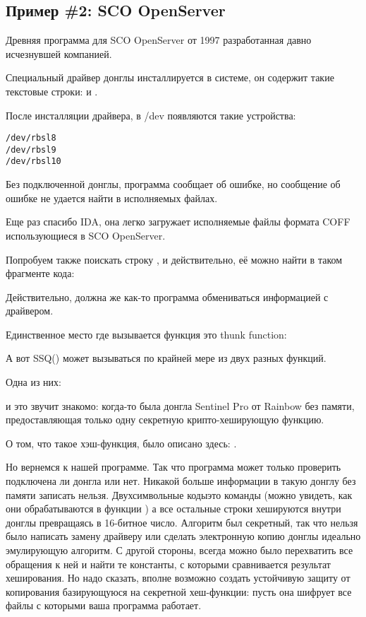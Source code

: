 \subsection{Пример \#2: SCO OpenServer}

\label{examples_SCO}
Древняя программа для SCO OpenServer от 1997 
разработанная давно исчезнувшей компанией.

Специальный драйвер донглы инсталлируется в системе, он содержит такие текстовые строки:
 и .

После инсталляции драйвера, в /dev появляются такие устройства:

\begin{lstlisting}
/dev/rbsl8
/dev/rbsl9
/dev/rbsl10
\end{lstlisting}

Без подключенной донглы, программа сообщает об ошибке, но сообщение об ошибке не удается
найти в исполняемых файлах.

Еще раз спасибо \ac{IDA}, она легко загружает исполняемые файлы формата COFF использующиеся в SCO OpenServer.

Попробуем также поискать строку , и действительно, её можно найти в таком фрагменте кода:



Действительно, должна же как-то программа обмениваться информацией с драйвером.

Единственное место где вызывается функция 
это \gls{thunk function}:



А вот SSQ() может вызываться по крайней мере из двух разных функций.

Одна из них:



 и  \EMDASH{}это звучит знакомо: когда-то была донгла
 Sentinel Pro от Rainbow без памяти,
предоставляющая только одну секретную крипто-хеширующую функцию.

О том, что такое хэш-функция, было описано здесь: .

Но вернемся к нашей программе.
Так что программа может только проверить подключена ли донгла или нет.
Никакой больше информации в такую донглу без памяти записать нельзя.
Двухсимвольные коды\EMDASH{}это команды
(можно увидеть, как они обрабатываются в функции 
) 
а все остальные строки хешируются внутри донглы превращаясь в 16-битное число.
Алгоритм был секретный, так что нельзя было написать замену драйверу или сделать
электронную копию донглы идеально эмулирующую алгоритм.
С другой стороны, всегда можно было перехватить все обращения к ней и найти те константы, с которыми
сравнивается результат хеширования.
Но надо сказать, вполне возможно создать устойчивую защиту от копирования базирующуюся
на секретной хеш-функции: пусть она шифрует все файлы с которыми ваша программа работает.

